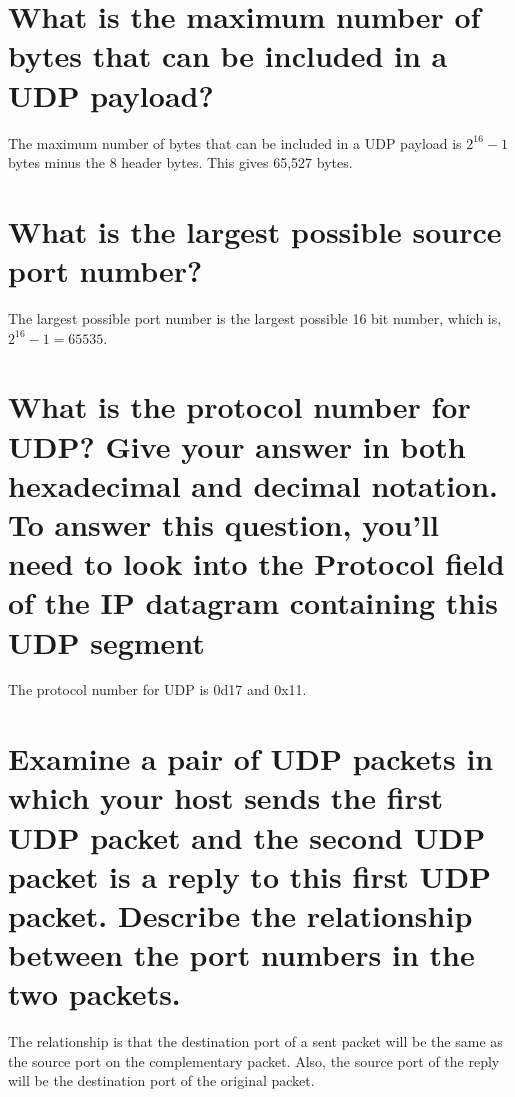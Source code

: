 \documentclass{article}
\begin{document}
\section{What is the maximum number of bytes that can be included in a UDP payload?}
The maximum number of bytes that can be included in a UDP payload is $2^{16} - 1$ bytes minus the 8 header bytes.  This gives 65,527 bytes.\\

\section{What is the largest possible source port number?}
The largest possible port number is the largest possible 16 bit number, which is, $2^{16} - 1 = 65535$.\\

\section{What is the protocol number for UDP? Give your answer in both hexadecimal and
decimal notation. To answer this question, you’ll need to look into the Protocol
field of the IP datagram containing this UDP segment}
The protocol number for UDP is 0d17 and 0x11.\\

\section{Examine a pair of UDP packets in which your host sends the first UDP packet and
the second UDP packet is a reply to this first UDP packet. Describe the relationship between the
port numbers in the two packets.}
The relationship is that the destination port of a sent packet will be the same as the source port on the complementary packet.  Also, the source port of the reply will be the destination port of the original packet.\\
\end{document}

